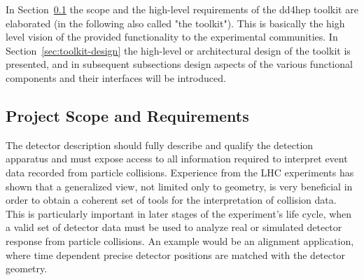 \noindent
In Section~\ref{sec:architectural-concepts} the scope and the high-level 
requirements of the dd4hep toolkit are elaborated (in the following 
also called "the toolkit"). This is basically the high level vision 
of the provided functionality to the experimental communities. 
In Section~\ref{sec:toolkit-design} the high-level or architectural design 
of the toolkit is presented, and in subsequent subsections design 
aspects of the various functional components and their interfaces will be
introduced.

\subsection{Project Scope and Requirements}
\label{sec:architectural-concepts}
\noindent
The detector description should fully describe and qualify 
the detection apparatus and must expose access to all information
required to interpret event data recorded from particle collisions.
Experience from the LHC experiments has shown that a generalized
view, not limited only to geometry, is very beneficial in order to obtain 
a coherent set of tools for the interpretation of collision data.
This is particularly important in later stages of the experiment's life cycle,
when a valid set of detector data must be used to analyze real or simulated 
detector response from particle collisions. An example would be an alignment 
application, where time dependent precise detector positions are matched 
with the detector geometry.

